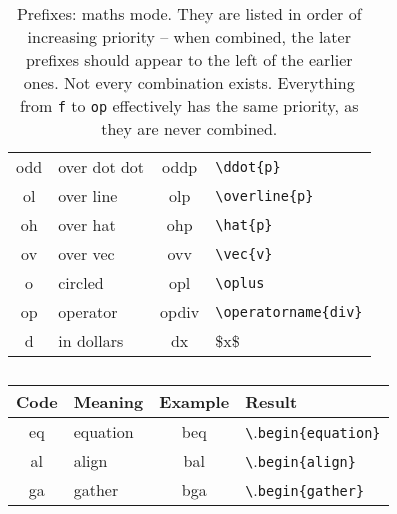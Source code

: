 \documentclass[11pt]{article}
\begin{document}
\begin{table}[tbh]
\begin{center}
\begin{tabular}{>{\ttfamily}cl>{\ttfamily}c>{\ttfamily}l}
    odd& over dot dot     & oddp{}  & \verb.\ddot{p}. \\
    ol& over line         & olp{}   & \verb.\overline{p}. \\
    oh& over hat          & ohp{}   & \verb.\hat{p}. \\
    ov& over vec          & ovv{}   & \verb.\vec{v}. \\
    o & circled{}         & opl{}   & \verb.\oplus. \\
    op& operator          & opdiv{} & \verb.\operatorname{div}. \\
    d & in dollars        & dx{}    & \$x\$ \\
  \bottomrule
  \end{tabular}
\end{center}
  \caption{Prefixes: maths mode.
  They are listed in order of increasing priority -- when combined, the later prefixes should appear to the left of the earlier ones.
  Not every combination exists.
  Everything from \texttt{f} to \texttt{op} effectively has the same priority, as they are never combined.
  }\label{tb:prefmaths}
\end{table}


\begin{table}[htb] 
\begin{center}
  \begin{tabular}{>{\ttfamily}cl>{\ttfamily}c>{\ttfamily}l}
  \toprule
    \textnormal{Code} & Meaning & \textnormal{Example} & \textnormal{Result} \\
  \midrule
  eq & equation & beq{} & \verb.\.\verb.begin{equation}. \\
  al & align & bal{} & \verb.\.\verb.begin{align}. \\
  ga & gather & bga{} & \verb.\.\verb.begin{gather}. \\
  \bottomrule
  \end{tabular}
\end{center}
\caption{}
\label{tb:suffeq}
\end{table}



\end{document}
